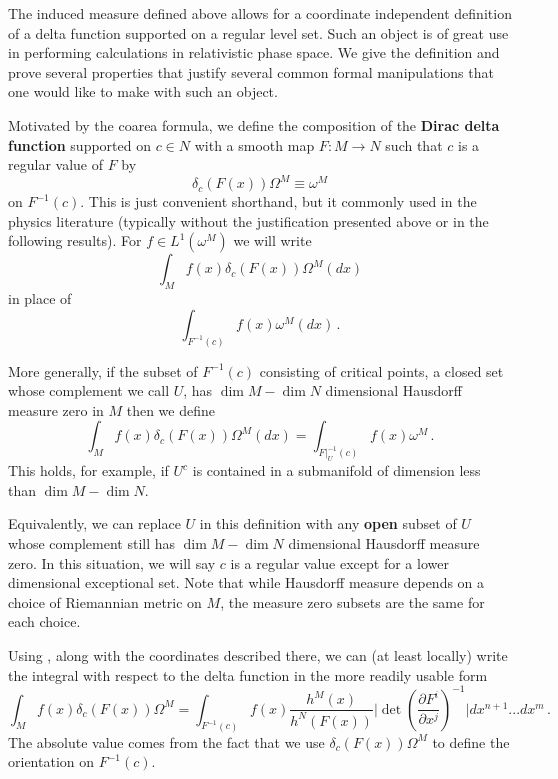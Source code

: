  The induced measure defined above allows for a coordinate independent definition of a delta function supported on a regular level set. Such an object is of great use in performing calculations in relativistic phase space. We give the definition and prove several properties that justify several common formal manipulations that one would like to make with such an object.
\begin{definition}
Motivated by the coarea formula, we define the composition of the {\bf Dirac delta function} supported on $c\in N$ with a smooth map $F:M\rightarrow N$ such that $c$ is a regular value of $F$ by
\begin{equation}\label{deltaDef}
 \delta_c(F(x))\Omega^M \equiv \omega^M
\end{equation}
on $F^{-1}(c)$. This is just convenient shorthand, but it commonly used in the physics literature (typically without the justification presented above or in the following results). For $f\in L^1(\omega^M)$ we will write 
\begin{equation}
\int_M f(x)\delta_c(F(x))\Omega^M(dx)
\end{equation} 
in place of 
\begin{equation}
\int_{F^{-1}(c)} f(x) \omega^M(dx)\,.
\end{equation}



More generally, if the subset of $F^{-1}(c)$ consisting of critical points, a closed set whose complement we call $U$, has $\dim M-\dim N$ dimensional Hausdorff measure zero in $M$ then we define
\begin{equation}
\int_M f(x)\delta_c(F(x))\Omega^M(dx)=\int_{F|_U^{-1}(c)} f(x)\omega^M\,.
\end{equation}
This holds, for example, if $U^c$ is contained in a submanifold of dimension less than $\dim M-\dim N$. 

Equivalently, we can replace $U$ in this definition with any {\bf open} subset of $U$ whose complement still has $\dim M-\dim N$ dimensional Hausdorff measure zero. In this situation, we will say $c$ is a regular value except for a lower dimensional exceptional set. Note that while Hausdorff measure depends on a choice of Riemannian metric on $M$, the measure zero subsets are the same for each choice.
\end{definition}

Using , along with the coordinates described there, we can (at least locally) write the integral with respect to the delta function in the more readily usable form
\begin{equation}\label{deltaIntegralCoords}
\int_M f(x)\delta_c(F(x))\Omega^M=\int_{F^{-1}(c)} f(x)\frac{h^M(x)}{h^N(F(x))}\bigg|\det \left(\frac{\partial F^i}{\partial x^j}\right)^{-1}\bigg|dx^{n+1}...dx^m\,.
\end{equation}
The absolute value comes from the fact that we use $\delta_c(F(x))\Omega^M$ to define the orientation on $F^{-1}(c)$.


